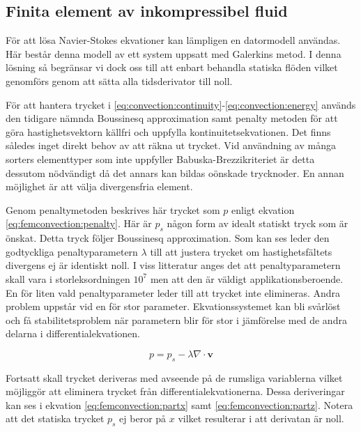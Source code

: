 \subsection{Finita element av inkompressibel fluid}

För att lösa Navier-Stokes ekvationer kan lämpligen en datormodell användas.
Här består denna modell av ett system uppsatt med Galerkins metod.
I denna lösning så begränsar vi dock oss till att enbart behandla statiska flöden
vilket genomförs genom att sätta alla tidsderivator till noll.

För att hantera trycket i \eqref{eq:convection:continuity}-\eqref{eq:convection:energy} används den tidigare nämnda Boussinesq approximation
samt penalty metoden för att göra hastighetsvektorn källfri och uppfylla
kontinuitetsekvationen. Det finns således inget direkt behov av att räkna ut trycket.
Vid användning av många sorters elementtyper som inte uppfyller Babuska-Brezzikriteriet
är detta dessutom nödvändigt då det annars kan bildas oönskade trycknoder. 
En annan möjlighet är att välja divergensfria element. \cite{babuska1973}\cite{segal2011}

Genom penaltymetoden beskrives här trycket som $p$ enligt ekvation
\eqref{eq:femconvection:penalty}. Här är $p_s$ någon form av idealt statiskt
tryck som är önskat. Detta tryck följer Boussinesq approximation.
\cite{heinrich88}\cite{taylor79}
Som kan ses leder den godtyckliga penaltyparametern $\lambda$ till att justera trycket
om hastighetsfältets divergens ej är identiskt noll. I viss litteratur anges 
det att penaltyparametern skall vara i storleksordningen $10^7$ men att den
är väldigt applikationsberoende. En för liten vald penaltyparameter leder till att
trycket inte elimineras. Andra problem uppstår vid en för stor parameter. Ekvationssystemet
kan bli svårlöst och få stabilitetsproblem när parametern blir
för stor i jämförelse med de andra delarna i differentialekvationen.\cite{reddy93}\cite{roy05}\cite{basak04}\cite{segal2011}

\begin{equation}
\label{eq:femconvection:penalty}
p = p_s - \lambda\nabla\cdot\mathbf{v}
\end{equation}

\noindent
Fortsatt skall trycket deriveras med avseende på de rumsliga variablerna vilket möjliggör
att eliminera trycket från differentialekvationerna. Dessa deriveringar kan ses i ekvation
\eqref{eq:femconvection:partx} samt \eqref{eq:femconvection:partz}.
Notera att det statiska trycket
$p_s$ ej beror på $x$ vilket resulterar i att derivatan är noll.

